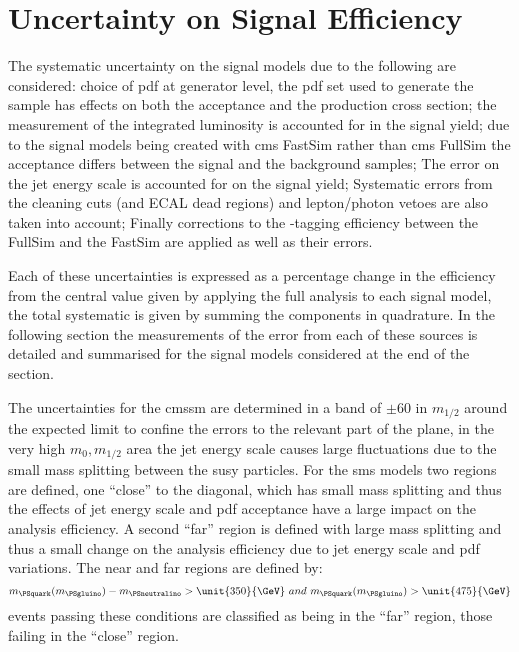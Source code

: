 \section{Uncertainty on Signal Efficiency} %
\label{sub:uncertainty_on_signal_efficiency}
The systematic uncertainty on the signal models due to the following are 
considered: choice of \ac{pdf} at generator level, the \ac{pdf} set used to 
generate the sample has effects on both the acceptance and the production cross 
section; the measurement of the integrated luminosity is accounted for in the 
signal yield; due to the signal models being created with \ac{cms} 
FastSim rather than \ac{cms} 
FullSim the acceptance differs between the signal 
and the background samples; The error on the jet energy scale is accounted for 
on the signal yield; Systematic errors from the cleaning cuts (\Rmiss and ECAL 
dead regions) and lepton/photon vetoes are also taken into account; Finally 
corrections to the \Pbottom-tagging efficiency between the FullSim and the 
FastSim are applied as well as their errors.

Each of these uncertainties is expressed as a percentage change in the 
efficiency from the central value given by applying the full analysis to each 
signal model, the total systematic is given by summing the components in 
quadrature. In the following section the measurements of the error from each of 
these sources is detailed and summarised for the signal models considered at the end 
of the section.

The uncertainties for the \ac{cmssm} are determined in a band of 
$\pm$\unit{60}{\GeV} in $m_{1/2}$ around the expected limit to confine the 
errors to the relevant part of the plane, in the very high $m_{0},m_{1/2}$ area 
the jet energy scale causes large fluctuations due to the small mass splitting 
between the \ac{susy} particles.
For the \ac{sms} models two regions are defined, one ``close'' to the diagonal, 
which has small mass splitting and thus the effects of jet energy scale and 
\ac{pdf} acceptance have a large impact on the analysis efficiency. A second 
``far'' region is defined with large mass splitting and thus a small change on 
the analysis efficiency due to jet energy scale and \ac{pdf} variations. The 
near and far regions are defined by:
\begin{equation}
  m_{\PSquark}(m_{\PSgluino}) - m_{\PSneutralino} > \unit{350}{\GeV}~and~m_{\PSquark}(m_{\PSgluino}) > \unit{475}{\GeV}
\end{equation}
events passing these conditions are classified as being in the ``far'' region, 
those failing in the ``close'' region.
 
